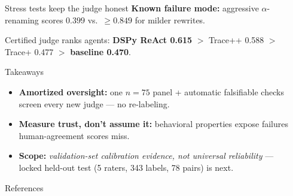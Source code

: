 \documentclass[final]{beamer}
\newlength{\sepwidth}
\newlength{\colwidth}
\newcommand{\separatorcolumn}{\begin{column}{\sepwidth}\end{column}}
\begin{document}
\begin{frame}[t]
\begin{columns}[t]
\begin{column}{\colwidth}
\begin{block}{Stress tests keep the judge honest}
    \textbf{Known failure mode:} aggressive $\alpha$-renaming scores $0.399$ vs.\ $\geq 0.849$ for milder rewrites.

    \medskip
    Certified judge ranks agents: \textbf{DSPy ReAct 0.615} $>$ Trace++ 0.588 $>$ Trace+ 0.477 $>$ \textbf{baseline 0.470}.

  \end{block}

  \vspace{0.4cm}
  \begin{alertblock}{Takeaways}

    \begin{itemize}
      \setlength{\leftmargini}{2.2em}
      \setlength{\itemsep}{0.9ex}
      \item \textbf{Amortized oversight:} one $n{=}75$ panel + automatic falsifiable checks screen every new judge --- no re-labeling.
      \item \textbf{Measure trust, don't assume it:} behavioral properties expose failures human-agreement scores miss.
      \item \textbf{Scope:} \emph{validation-set calibration evidence, not universal reliability} --- locked held-out test (5 raters, 343 labels, 78 pairs) is next.
    \end{itemize}

  \end{alertblock}

  \vspace{-0.85cm}
  \begin{block}{References}

    \nocite{Zheng2023MTBench,TongZhang2024CodeJudge}
    {\small\setlength{\parskip}{0pt}\setlength{\itemsep}{0pt}\setlength{\parsep}{0pt}}

  \end{block}

\end{column}

\separatorcolumn
\end{columns}
\end{frame}
\end{document}
